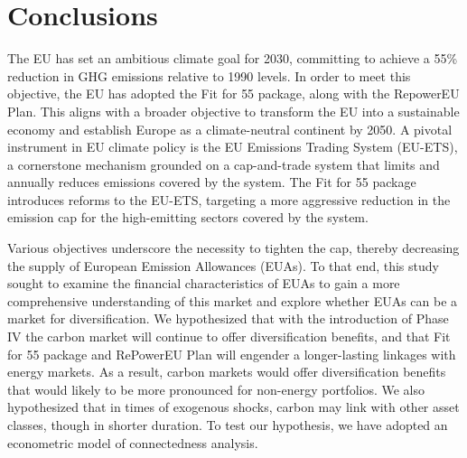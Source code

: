 \documentclass[preprint, 3p,
authoryear]{elsarticle} %
\begin{document}
\hypertarget{conclusions}{%
\section{Conclusions}\label{conclusions}}

The EU has set an ambitious climate goal for 2030, committing to achieve
a 55\% reduction in GHG emissions relative to 1990 levels. In order to
meet this objective, the EU has adopted the Fit for 55 package, along
with the RepowerEU Plan. This aligns with a broader objective to
transform the EU into a sustainable economy and establish Europe as a
climate-neutral continent by 2050. A pivotal instrument in EU climate
policy is the EU Emissions Trading System (EU-ETS), a cornerstone
mechanism grounded on a cap-and-trade system that limits and annually
reduces emissions covered by the system. The Fit for 55 package
introduces reforms to the EU-ETS, targeting a more aggressive reduction
in the emission cap for the high-emitting sectors covered by the system.

Various objectives underscore the necessity to tighten the cap, thereby
decreasing the supply of European Emission Allowances (EUAs). To that
end, this study sought to examine the financial characteristics of EUAs
to gain a more comprehensive understanding of this market and explore
whether EUAs can be a market for diversification. We hypothesized that
with the introduction of Phase IV the carbon market will continue to
offer diversification benefits, and that Fit for 55 package and
RePowerEU Plan will engender a longer-lasting linkages with energy
markets. As a result, carbon markets would offer diversification
benefits that would likely to be more pronounced for non-energy
portfolios. We also hypothesized that in times of exogenous shocks,
carbon may link with other asset classes, though in shorter duration. To
test our hypothesis, we have adopted an econometric model of
connectedness analysis.
\end{document}
